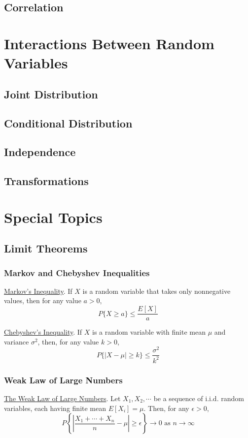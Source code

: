 \section{Correlation}

\chapter{Interactions Between Random Variables}
\section{Joint Distribution}
\section{Conditional Distribution}
\section{Independence}
\section{Transformations}

\chapter{Special Topics}
\section{Limit Theorems}
\subsection{Markov and Chebyshev Inequalities}
\begin{theorem}
	{\underline{Markov's Inequality}}. If $X$ is a random variable that takes only nonnegative values, then for any value $a > 0$, $$P\{X \ge a\} \le \frac{E[X]}{a}$$
\end{theorem}

\begin{theorem}
	{\underline{Chebyshev's Inequality}}. If $X$ is a random variable with finite mean $\mu$ and variance $\sigma^2$, then, for any value $k > 0$, $$P\{|X-\mu| \ge k\} \le \frac{\sigma^2}{k^2}$$
\end{theorem}

\subsection{Weak Law of Large Numbers}
\begin{theorem}
	{\underline{The Weak Law of Large Numbers}}. Let $X_1, X_2, \cdots$ be a sequence of i.i.d. random variables, each having finite mean $E[X_i] = \mu$. Then, for any $\epsilon > 0$, $$P\left\{\left|\frac{X_1+\cdots+X_n}{n} - \mu\right| \ge \epsilon \right\} \to 0 \mbox{ as } n \to \infty$$
\end{theorem}

